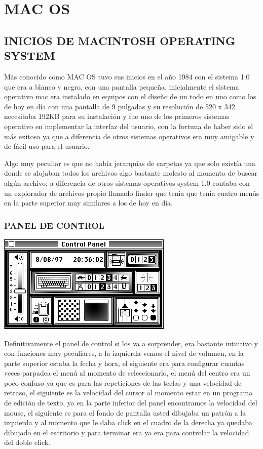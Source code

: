 \chapter*{MAC OS}

\section*{INICIOS DE MACINTOSH OPERATING SYSTEM}
Más conocido como MAC OS tuvo sus inicios en el año 1984 con
el sistema 1.0 que era a blanco y negro, con una pantalla
pequeña. inicialmente el sistema operativo mac era instalado en
equipos con el diseño de un todo en uno como los de hoy en día
con una pantalla de 9 pulgadas y su resolución de 520 x 342.
necesitaba 192KB para su instalación y fue uno de los primeros
sistemas operativo en implementar la interfaz del usuario, con la
fortuna de haber sido el más exitoso ya que a diferencia de otros
sistemas operativos era muy amigable y de fácil uso para el
usuario.

Algo muy peculiar es que no había jerarquías de carpetas ya que
solo existía una donde se alojaban todos los archivos algo
bastante molesto al momento de buscar algún archivo; a
diferencia de otros sistemas operativos system 1.0 contaba con
un explorador de archivos propio llamado finder que tenia que
tenia cuatro menús en la parte superior muy similares a los de
hoy en día.

\subsection*{PANEL DE CONTROL}

\includegraphics[scale=0.5]{img/cp09/img0901.png}

Definitivamente el
panel de control si los
va a sorprender, era
bastante intuitivo y
con funciones muy
peculiares, a la
izquierda vemos el
nivel de volumen, en
la parte superior
estaba la fecha y hora,
el siguiente era para
configurar cuantas
veces parpadea el menú al momento de seleccionarlo,
el menú del centro era un poco confuso ya que es para las
repeticiones de las teclas y una velocidad de retraso, el
siguiente es la velocidad del cursor al momento estar en un
programa de edición de texto, ya en la parte inferior del panel
encontramos la velocidad del mouse, el siguiente es para el
fondo de pantalla usted dibujaba un patrón a la izquierda y al
momento que le daba click en el cuadro de la derecha ya
quedaba dibujado en el escritorio y para terminar era ya era
para controlar la velocidad del doble click.

